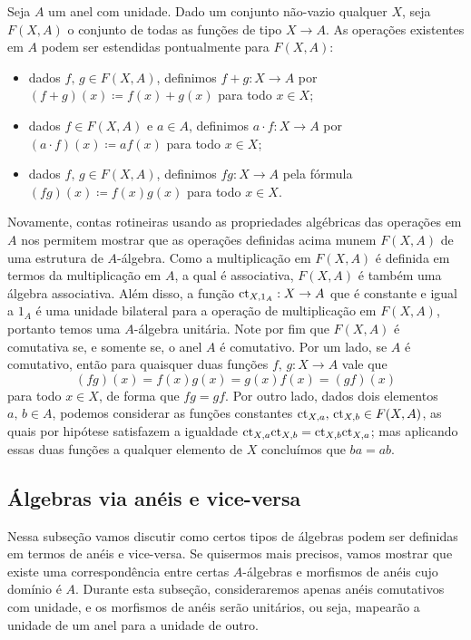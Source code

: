 \begin{exem}\label{exem:algebra_funcoes}
  Seja $A$ um anel com unidade.
  Dado um conjunto não-vazio qualquer $X$, seja $F(X,A)$ o conjunto de todas as funções de tipo $X \to A$.
  As operações existentes em $A$ podem ser estendidas pontualmente para $F(X,A)$:
  \begin{itemize}
  \item dados $f,\, g \in F(X,A)$, definimos $f+g: X \to A$ por $(f+g)(x) \coloneqq f(x) + g(x)$ para todo $x \in X$;
    
  \item dados $f \in F(X,A)$ e $a \in A$, definimos $a \cdot f: X \to A$ por $(a \cdot f)(x) \coloneqq af(x)$ para todo $x \in X$;
    
  \item dados $f,\, g \in F(X,A)$, definimos $fg: X \to A$ pela fórmula $(fg)(x) \coloneqq f(x)g(x)$ para todo $x \in X$.
  \end{itemize}

  Novamente, contas rotineiras usando as propriedades algébricas das operações em $A$ nos permitem mostrar que as operações definidas acima munem $F(X,A)$ de uma estrutura de $A$-álgebra.
  Como a multiplicação em $F(X,A)$ é definida em termos da multiplicação em $A$, a qual é associativa, $F(X,A)$ é também uma álgebra associativa.
  Além disso, a função $\mathrm{ct}_{X,1_A}: X \to A$ que é constante e igual a $1_A$ é uma unidade bilateral para a operação de multiplicação em $F(X,A)$, portanto temos uma $A$-álgebra unitária.
  Note por fim que $F(X,A)$ é comutativa se, e somente se, o anel $A$ é comutativo.
  Por um lado, se $A$ é comutativo, então para quaisquer duas funções $f,\,g: X \to A$ vale que
  \begin{displaymath}
    (fg)(x) = f(x)g(x) = g(x)f(x) = (gf)(x)
  \end{displaymath}
  para todo $x \in X$, de forma que $fg=gf$.
  Por outro lado, dados dois elementos $a,\,b \in A$, podemos considerar as funções constantes $\mathrm{ct}_{X,a},\, \mathrm{ct}_{X,b} \in F(X,A)$, as quais por hipótese satisfazem a igualdade $\mathrm{ct}_{X,a}\mathrm{ct}_{X,b} = \mathrm{ct}_{X,b}\mathrm{ct}_{X,a}$; mas aplicando essas duas funções a qualquer elemento de $X$ concluímos que $ba = ab$.
\end{exem}

\subsection{Álgebras via anéis e vice-versa}

Nessa subseção vamos discutir como certos tipos de álgebras podem ser definidas em termos de anéis e vice-versa.
Se quisermos mais precisos, vamos mostrar que existe uma correspondência entre certas $A$-álgebras e morfismos de anéis cujo domínio é $A$.
Durante esta subseção, consideraremos apenas anéis comutativos com unidade, e os morfismos de anéis serão unitários, ou seja, mapearão a unidade de um anel para a unidade de outro.

